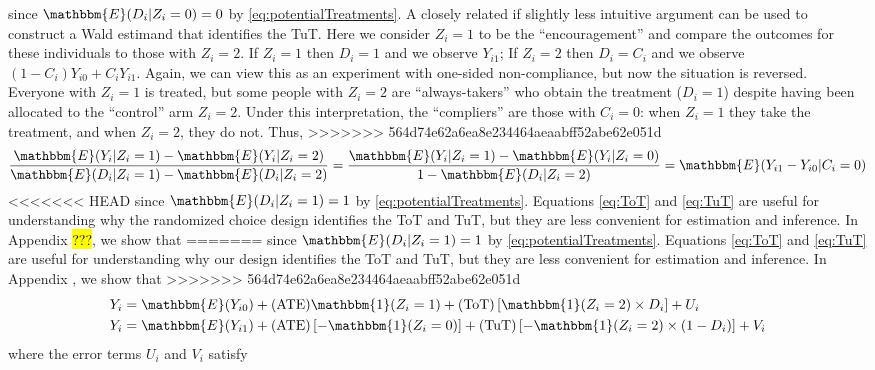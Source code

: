 \documentclass[oneside,11pt]{article}
\begin{document}
{\vspace{.1in}
\noindent since $\mathbbm{E}(D_i|Z_i=0)=0$ by \eqref{eq:potentialTreatments}. 
A closely related if slightly less intuitive argument can be used to construct a Wald estimand that identifies the TuT. Here we consider $Z_i = 1$ to be the ``encouragement'' and compare the outcomes for these individuals to those with $Z_i = 2$. If $Z_i = 1$ then $D_i = 1$ and we observe $Y_{i1}$; If $Z_i = 2$ then $D_i = C_i$ and we observe $(1 - C_i) Y_{i0} + C_i Y_{i1}$. Again, we can view this as an experiment with one-sided non-compliance, but now the situation is reversed. Everyone with $Z_i = 1$ is treated, but some people with $Z_i = 2$ are ``always-takers'' who obtain the treatment ($D_i = 1$) despite having been allocated to the ``control'' arm $Z_i=2$. Under this interpretation, the ``compliers'' are those with $C_i = 0$: when $Z_i=1$ they take the treatment, and when $Z_i=2$, they do not. Thus, 
>>>>>>> 564d74e62a6ea8e234464aeaabff52abe62e051d
\begin{equation}
\frac{\mathbbm{E}(Y_i|Z_i=1) - \mathbbm{E}(Y_i|Z_i =2)}{\mathbbm{E}(D_i|Z_i=1)-\mathbbm{E}(D_i|Z_i=2)} = 
\frac{\mathbbm{E}(Y_i|Z_i=1) - \mathbbm{E}(Y_i|Z_i =0)}{1 - \mathbbm{E}(D_i|Z_i=2)} = \mathbbm{E}(Y_{i1} - Y_{i0} | C_i = 0)
\label{eq:TuT}
\end{equation}
<<<<<<< HEAD
since $\mathbbm{E}(D_i|Z_i = 1)= 1$ by \eqref{eq:potentialTreatments}. Equations \eqref{eq:ToT} and \eqref{eq:TuT} are useful for understanding why the randomized choice design identifies the ToT and TuT, but they are less convenient for estimation and inference. 
In Appendix \hl{???}, we show that
=======
\vspace{.1in} \noindent since $\mathbbm{E}(D_i|Z_i = 1)= 1$ by \eqref{eq:potentialTreatments}. Equations \eqref{eq:ToT} and \eqref{eq:TuT} are useful for understanding why our design identifies the ToT and TuT, but they are less convenient for estimation and inference. In Appendix , we show that
>>>>>>> 564d74e62a6ea8e234464aeaabff52abe62e051d
\begin{align}
\label{eq:ToTreg}
Y_i &= \mathbbm{E}(Y_{i0}) + (\text{ATE}) \mathbbm{1}(Z_i = 1) + (\text{ToT}) \left[\mathbbm{1}(Z_i = 2) \times D_i\right] + U_i \\
\label{eq:TuTreg}
Y_i &= \mathbbm{E}(Y_{i1}) + (\text{ATE}) \left[ -\mathbbm{1}(Z_i = 0)\right] + (\text{TuT}) \left[ -\mathbbm{1}(Z_i = 2) \times (1 - D_i)\right] + V_i 
\end{align}
where the error terms $U_i$ and $V_i$ satisfy 
}
\end{document}
